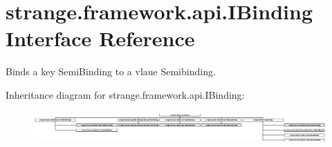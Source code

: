 \hypertarget{interfacestrange_1_1framework_1_1api_1_1_i_binding}{\section{strange.\-framework.\-api.\-I\-Binding Interface Reference}
\label{interfacestrange_1_1framework_1_1api_1_1_i_binding}
}


Binds a key Semi\-Binding to a vlaue Semibinding.  


Inheritance diagram for strange.\-framework.\-api.\-I\-Binding\-:\begin{figure}[H]
\begin{center}
\leavevmode
\includegraphics[height=1.243523cm]{interfacestrange_1_1framework_1_1api_1_1_i_binding}
\end{center}
\end{figure}
